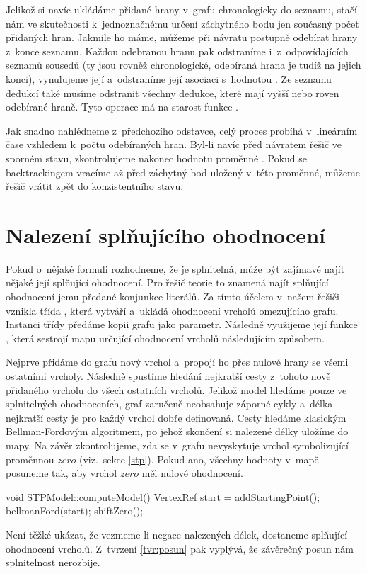 Jelikož si navíc ukládáme přidané hrany v~grafu chronologicky do seznamu, stačí nám ve skutečnosti k~jednoznačnému určení záchytného bodu jen současný počet přidaných hran. Jakmile ho máme, můžeme při návratu postupně odebírat hrany z~konce seznamu. Každou odebranou hranu pak odstraníme i~z~odpovídajících seznamů sousedů (ty jsou rovněž chronologické, odebíraná hrana je tudíž na jejich konci), vynulujeme její  a~odstraníme její asociaci s~hodnotou . Ze seznamu dedukcí také musíme odstranit všechny dedukce, které mají  vyšší nebo roven odebírané hraně.  Tyto operace má na starost funkce . 

Jak snadno nahlédneme z~předchozího odstavce, celý proces probíhá v~lineárním čase vzhledem k~počtu odebíraných hran. Byl-li navíc před návratem řešič ve sporném stavu, zkontrolujeme nakonec hodnotu proměnné . Pokud se backtrackingem vracíme až před záchytný bod uložený v~této proměnné, můžeme řešič vrátit zpět do konzistentního stavu.

\section{Nalezení splňujícího ohodnocení}

Pokud o~nějaké formuli rozhodneme, že je splnitelná, může být zajímavé najít nějaké její splňující ohodnocení. Pro řešič teorie to znamená najít splňující ohodnocení jemu předané konjunkce literálů. Za tímto účelem v~našem řešiči vznikla třída , která vytváří a~ukládá ohodnocení vrcholů omezujícího grafu. Instanci třídy předáme kopii grafu jako parametr. Následně využijeme její funkce , která sestrojí mapu určující ohodnocení vrcholů následujícím způsobem.

Nejprve přidáme do grafu nový vrchol a~propojí ho přes nulové hrany se všemi ostatními vrcholy. Následně spustíme hledání nejkratší cesty z~tohoto nově přidaného vrcholu do všech ostatních vrcholů. Jelikož model hledáme pouze ve splnitelných ohodnoceních, graf zaručeně neobsahuje záporné cykly a~délka nejkratší cesty je pro každý vrchol dobře definovaná. Cesty hledáme klasickým Bellman-Fordovým algoritmem, po jehož skončení si nalezené délky uložíme do mapy. Na závěr zkontrolujeme, zda se v~grafu nevyskytuje vrchol symbolizující proměnnou $zero$ (viz.~sekce \ref{stp}). Pokud ano, všechny hodnoty v~mapě posuneme tak, aby vrchol $zero$ měl nulové ohodnocení.
\begin{code}
void STPModel::computeModel() {
	VertexRef start = addStartingPoint();
	bellmanFord(start);
	shiftZero();
}
\end{code}
Není těžké ukázat, že vezmeme-li negace nalezených délek, dostaneme splňující ohodnocení vrcholů. Z~tvrzení \ref{tvr:posun} pak vyplývá, že závěrečný posun nám splnitelnost nerozbije.

